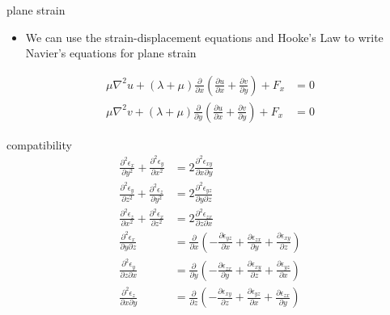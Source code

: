 \documentclass[
  letterpaper,
  ignorenonframetext,
  aspectratio=43,
  handout,
  12pt]{beamer}
\providecommand{\tightlist}{%
  \setlength{\itemsep}{0pt}\setlength{\parskip}{0pt}}
\providecommand{\tightlist}{%
\setlength{\itemsep}{0pt}\setlength{\parskip}{0pt}}
\begin{document}
\begin{frame}{plane strain}
\protect\hypertarget{plane-strain-6}{}
\begin{itemize}
\tightlist
\item
  We can use the strain-displacement equations and Hooke's Law to write
  Navier's equations for plane strain
\end{itemize}

\[\begin{aligned}
    \mu \nabla^2 u + (\lambda + \mu) \frac{\partial}{\partial x} \left(\frac{\partial u}{\partial x} + \frac{\partial v}{\partial y}\right) + F_x &= 0\\
    \mu \nabla^2 v + (\lambda + \mu) \frac{\partial}{\partial y} \left(\frac{\partial u}{\partial x} + \frac{\partial v}{\partial y}\right) + F_x &= 0
\end{aligned}\]
\end{frame}

\begin{frame}{compatibility}
\protect\hypertarget{compatibility}{}
\[\begin{aligned}
    \frac{\partial^2 \epsilon_x}{\partial y^2} + \frac{\partial^2 \epsilon_y}{\partial x^2} &= 2\frac{\partial^2 \epsilon_{xy}}{\partial x \partial y}\\
    \frac{\partial^2 \epsilon_y}{\partial z^2} + \frac{\partial^2 \epsilon_z}{\partial y^2} &= 2\frac{\partial^2 \epsilon_{yz}}{\partial y \partial z}\\
    \frac{\partial^2 \epsilon_z}{\partial x^2} + \frac{\partial^2 \epsilon_x}{\partial z^2} &= 2\frac{\partial^2 \epsilon_{zx}}{\partial z \partial x}\\
    \frac{\partial^2 \epsilon_x}{\partial y \partial z} &= \frac{\partial}{\partial x} \left(-\frac{\partial \epsilon_{yz}}{\partial x} + \frac{\partial \epsilon_{zx}}{\partial y} + \frac{\partial \epsilon_{xy}}{\partial z}\right)\\
    \frac{\partial^2 \epsilon_y}{\partial z \partial x} &= \frac{\partial}{\partial y} \left(-\frac{\partial \epsilon_{zx}}{\partial y} + \frac{\partial \epsilon_{xy}}{\partial z} + \frac{\partial \epsilon_{yz}}{\partial x}\right)\\
    \frac{\partial^2 \epsilon_z}{\partial x \partial y} &= \frac{\partial}{\partial z} \left(-\frac{\partial \epsilon_{xy}}{\partial z} + \frac{\partial \epsilon_{yz}}{\partial x} + \frac{\partial \epsilon_{zx}}{\partial y}\right)
\end{aligned}\]
\end{frame}
\end{document}
